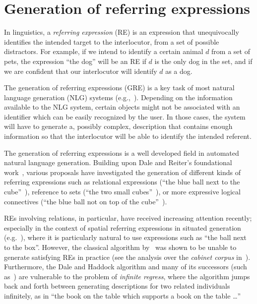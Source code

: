 \section{Generation of referring expressions}\label{sec:gre}

In linguistics, a \emph{referring expression} (RE) is an expression that 
unequivocally identifies the intended target to the interlocutor, from a set of possible distractors.  
For example, if we intend to identify a certain animal $d$ from a set of pets, the expression 
``the dog'' will be an RE if $d$ is the only dog in the set, and if we are confident
that our interlocutor will identify $d$ as a dog. 

The generation of referring expressions (GRE)  is a key task of most natural 
language generation (NLG) systems (e.g.,~\cite[Section 5.4]{dale2000}). 
Depending on the information available to the NLG system, certain objects might 
not be associated with an identifier which can be easily recognized by the user. 
In those cases, the system will have to generate a, possibly complex, description that contains 
enough information so that the interlocutor will be able to identify the intended referent.

The generation of referring expressions is a well developed field in automated natural language generation.
Building upon Dale and Reiter's foundational work~\cite{dale89cooking,Dale1995},
various proposals have investigated the generation of different kinds of referring expressions 
such as relational expressions (``the blue ball next to the cube''~\cite{dale91:_gener_refer_expres_invol_relat}),
reference to sets (``the two small cubes''~\cite{Stone2000}), or more expressive logical connectives (``the 
blue ball not on top of the cube''~\cite{deemter02:_gener_refer_expres}).

REs involving relations, in particular, have
received increasing attention recently; especially in the context of
spatial referring expressions in situated generation (e.g.~\cite{kelleher06:_increm_gener_of_spatial_refer}), where it is
particularly natural to use expressions such as ``the ball next to the box''.  However, the classical algorithm by~\cite{dale91:_gener_refer_expres_invol_relat} was shown to be unable to generate satisfying REs in practice (see the 
analysis over the \emph{cabinet corpus} in~\cite{viethen06:_algor_for_gener_refer_expres}).  Furthermore, the Dale
and Haddock algorithm and many of its successors (such as~\cite{kelleher06:_increm_gener_of_spatial_refer}) are vulnerable to
the problem of \emph{infinite regress}, where the algorithm jumps back
and forth between generating descriptions for two related individuals
infinitely, as in ``the book on the table which supports a book on the
table \ldots''

